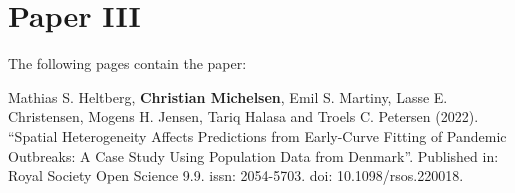 \chapter{Paper III}
\label{chapter:covid19-agent-based-model}

The following pages contain the paper:
\vspace*{1cm}


Mathias S. Heltberg, \textbf{Christian Michelsen}, Emil S. Martiny, Lasse E. Christensen, Mogens H. Jensen, Tariq Halasa and Troels C. Petersen (2022). ``Spatial Heterogeneity Affects Predictions from Early-Curve Fitting of Pandemic Outbreaks: A Case Study Using Population Data from Denmark''. Published in: Royal Society Open Science 9.9. issn: 2054-5703. doi: 10.1098/rsos.220018.

\clearpage
